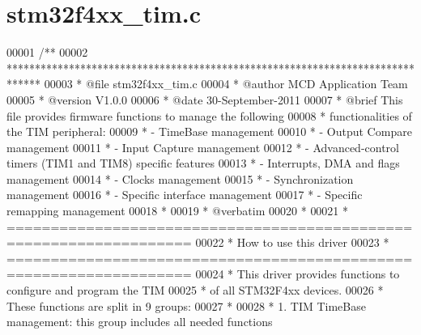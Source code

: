 \section{stm32f4xx\+\_\+tim.\+c}
\label{stm32f4xx__tim_8c_source}

\begin{DoxyCode}
00001 \textcolor{comment}{/**}
00002 \textcolor{comment}{  ******************************************************************************}
00003 \textcolor{comment}{  * @file    stm32f4xx\_tim.c}
00004 \textcolor{comment}{  * @author  MCD Application Team}
00005 \textcolor{comment}{  * @version V1.0.0}
00006 \textcolor{comment}{  * @date    30-September-2011}
00007 \textcolor{comment}{  * @brief   This file provides firmware functions to manage the following }
00008 \textcolor{comment}{  *          functionalities of the TIM peripheral:}
00009 \textcolor{comment}{  *            - TimeBase management}
00010 \textcolor{comment}{  *            - Output Compare management}
00011 \textcolor{comment}{  *            - Input Capture management}
00012 \textcolor{comment}{  *            - Advanced-control timers (TIM1 and TIM8) specific features  }
00013 \textcolor{comment}{  *            - Interrupts, DMA and flags management}
00014 \textcolor{comment}{  *            - Clocks management}
00015 \textcolor{comment}{  *            - Synchronization management}
00016 \textcolor{comment}{  *            - Specific interface management}
00017 \textcolor{comment}{  *            - Specific remapping management      }
00018 \textcolor{comment}{  *              }
00019 \textcolor{comment}{  *  @verbatim}
00020 \textcolor{comment}{  *  }
00021 \textcolor{comment}{  *          ===================================================================}
00022 \textcolor{comment}{  *                                 How to use this driver}
00023 \textcolor{comment}{  *          ===================================================================}
00024 \textcolor{comment}{  *          This driver provides functions to configure and program the TIM }
00025 \textcolor{comment}{  *          of all STM32F4xx devices.}
00026 \textcolor{comment}{  *          These functions are split in 9 groups: }
00027 \textcolor{comment}{  *   }
00028 \textcolor{comment}{  *          1. TIM TimeBase management: this group includes all needed functions }

\end{DoxyCode}
